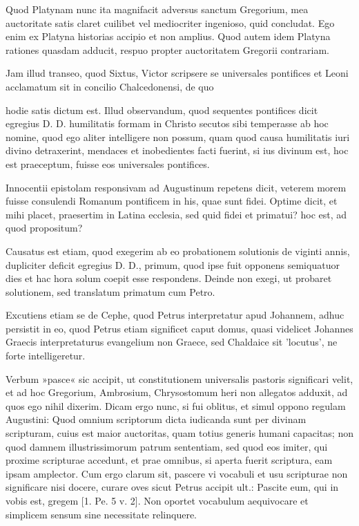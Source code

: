 Quod Platynam nunc ita magnifacit adversus sanctum Gregorium, mea auctoritate satis claret cuilibet vel mediocriter ingenioso, quid concludat. Ego enim ex Platyna historias accipio et non amplius. Quod autem idem Platyna rationes quasdam adducit, respuo propter auctoritatem Gregorii contrariam.

Jam illud transeo, quod Sixtus, Victor scripsere se universales pontifices et Leoni acclamatum sit in concilio Chalcedonensi, de quo

hodie satis dictum est. Illud observandum, quod sequentes pontifices dicit egregius D. D. humilitatis formam in Christo secutos sibi temperasse ab hoc nomine, quod ego aliter intelligere non possum, quam quod causa humilitatis iuri divino detraxerint, mendaces et inobedientes facti fuerint, si ius divinum est, hoc est praeceptum, fuisse eos universales pontifices.

Innocentii epistolam responsivam ad Augustinum repetens dicit, veterem morem fuisse consulendi Romanum pontificem in his, quae sunt fidei. Optime dicit, et mihi placet, praesertim in Latina ecclesia, sed quid fidei et primatui? hoc est, ad quod propositum?

Causatus est etiam, quod exegerim ab eo probationem solutionis de viginti annis, dupliciter deficit egregius D. D., primum, quod ipse fuit opponens semiquatuor dies et hac hora solum coepit esse respondens. Deinde non exegi, ut probaret solutionem, sed translatum primatum cum Petro.

Excutiens etiam se de Cephe, quod Petrus interpretatur apud Johannem, adhuc persistit in eo, quod Petrus etiam significet caput domus, quasi videlicet Johannes Graecis interpretaturus evangelium non Graece, sed Chaldaice sit 'locutus', ne forte intelligeretur.

Verbum »pasce« sic accipit, ut constitutionem universalis pastoris significari velit, et ad hoc Gregorium, Ambrosium, Chrysostomum heri non allegatos adduxit, ad quos ego nihil dixerim. Dicam ergo nunc, si fui oblitus, et simul oppono regulam Augustini: Quod omnium scriptorum dicta iudicanda sunt per divinam scripturam, cuius est maior auctoritas, quam totius generis humani capacitas; non quod damnem illustrissimorum patrum sententiam, sed quod eos imiter, qui proxime scripturae accedunt, et prae omnibus, si aperta fuerit scriptura, eam ipsam amplector. Cum ergo clarum sit, pascere vi vocabuli et usu scripturae non significare nisi docere, curare \marginpar{\small[310]} oves sicut Petrus accipit ult.: Pascite eum, qui in vobis est, gregem [1. Pe. 5 v. 2]. Non oportet vocabulum aequivocare et simplicem sensum sine necessitate relinquere.

